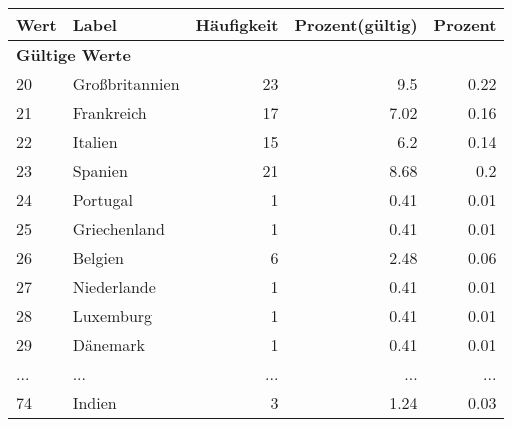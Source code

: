      \begin{longtable}{lXrrr}
     \toprule
     \textbf{Wert} & \textbf{Label} & \textbf{Häufigkeit} & \textbf{Prozent(gültig)} & \textbf{Prozent} \\
     \endhead
     \midrule
     \multicolumn{5}{l}{\textbf{Gültige Werte}}\\
        20 & \multicolumn{1}{X}{Großbritannien} & %
          \num{23} &
          \num[round-mode=places,round-precision=2]{9.5} &
          \num[round-mode=places,round-precision=2]{0.22} \\
        21 & \multicolumn{1}{X}{Frankreich} & %
          \num{17} &
          \num[round-mode=places,round-precision=2]{7.02} &
          \num[round-mode=places,round-precision=2]{0.16} \\
        22 & \multicolumn{1}{X}{Italien} & %
          \num{15} &
          \num[round-mode=places,round-precision=2]{6.2} &
          \num[round-mode=places,round-precision=2]{0.14} \\
        23 & \multicolumn{1}{X}{Spanien} & %
          \num{21} &
          \num[round-mode=places,round-precision=2]{8.68} &
          \num[round-mode=places,round-precision=2]{0.2} \\
        24 & \multicolumn{1}{X}{Portugal} & %
          \num{1} &
          \num[round-mode=places,round-precision=2]{0.41} &
          \num[round-mode=places,round-precision=2]{0.01} \\
        25 & \multicolumn{1}{X}{Griechenland} & %
          \num{1} &
          \num[round-mode=places,round-precision=2]{0.41} &
          \num[round-mode=places,round-precision=2]{0.01} \\
        26 & \multicolumn{1}{X}{Belgien} & %
          \num{6} &
          \num[round-mode=places,round-precision=2]{2.48} &
          \num[round-mode=places,round-precision=2]{0.06} \\
        27 & \multicolumn{1}{X}{Niederlande} & %
          \num{1} &
          \num[round-mode=places,round-precision=2]{0.41} &
          \num[round-mode=places,round-precision=2]{0.01} \\
        28 & \multicolumn{1}{X}{Luxemburg} & %
          \num{1} &
          \num[round-mode=places,round-precision=2]{0.41} &
          \num[round-mode=places,round-precision=2]{0.01} \\
        29 & \multicolumn{1}{X}{Dänemark} & %
          \num{1} &
          \num[round-mode=places,round-precision=2]{0.41} &
          \num[round-mode=places,round-precision=2]{0.01} \\
       ... & ... & ... & ... & ... \\
        74 & \multicolumn{1}{X}{Indien} & %
          \num{3} &
          \num[round-mode=places,round-precision=2]{1.24} &
          \num[round-mode=places,round-precision=2]{0.03} \\


\end{longtable}
